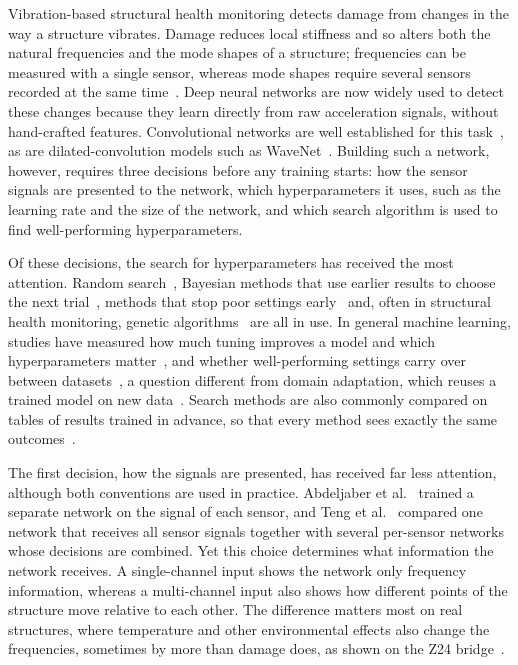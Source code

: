 \documentclass[11pt,a4paper]{article}
\begin{document}
Vibration-based structural health monitoring detects damage from changes in the way a structure vibrates. Damage reduces local stiffness and so alters both the natural frequencies and the mode shapes of a structure; frequencies can be measured with a single sensor, whereas mode shapes require several sensors recorded at the same time~\cite{doebling1996,fan2011}. Deep neural networks are now widely used to detect these changes because they learn directly from raw acceleration signals, without hand-crafted features. Convolutional networks are well established for this task~\cite{abdeljaber2017}, as are dilated-convolution models such as WaveNet~\cite{vandenoord2016,dabbous2024}. Building such a network, however, requires three decisions before any training starts: how the sensor signals are presented to the network, which hyperparameters it uses, such as the learning rate and the size of the network, and which search algorithm is used to find well-performing hyperparameters.

Of these decisions, the search for hyperparameters has received the most attention. Random search~\cite{bergstra2012}, Bayesian methods that use earlier results to choose the next trial~\cite{bergstra2011,snoek2012}, methods that stop poor settings early~\cite{li2018} and, often in structural health monitoring, genetic algorithms~\cite{lee2021,santos2017} are all in use. In general machine learning, studies have measured how much tuning improves a model and which hyperparameters matter~\cite{probst2019,vanrijn2018}, and whether well-performing settings carry over between datasets~\cite{wistuba2015,wistuba2016}, a question different from domain adaptation, which reuses a trained model on new data~\cite{rezazadeh2026}. Search methods are also commonly compared on tables of results trained in advance, so that every method sees exactly the same outcomes~\cite{ying2019,klein2019,eggensperger2021}.

The first decision, how the signals are presented, has received far less attention, although both conventions are used in practice. Abdeljaber et al.~\cite{abdeljaber2017} trained a separate network on the signal of each sensor, and Teng et al.~\cite{teng2021} compared one network that receives all sensor signals together with several per-sensor networks whose decisions are combined. Yet this choice determines what information the network receives. A single-channel input shows the network only frequency information, whereas a multi-channel input also shows how different points of the structure move relative to each other. The difference matters most on real structures, where temperature and other environmental effects also change the frequencies, sometimes by more than damage does, as shown on the Z24 bridge~\cite{peeters2001}.
\end{document}
